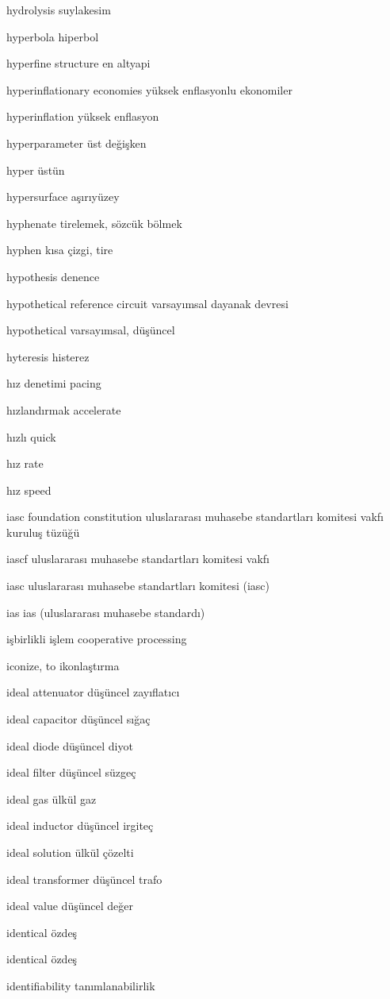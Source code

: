 \documentclass[12pt,fleqn]{article}\usepackage{../../common}
\begin{document}
hydrolysis suylakesim

hyperbola hiperbol

hyperfine structure en altyapi

hyperinflationary economies yüksek enflasyonlu ekonomiler

hyperinflation yüksek enflasyon

hyperparameter üst değişken

hyper üstün

hypersurface aşırıyüzey

hyphenate tirelemek, sözcük bölmek

hyphen kısa çizgi, tire

hypothesis denence

hypothetical reference circuit varsayımsal dayanak devresi

hypothetical varsayımsal, düşüncel

hyteresis histerez

hız denetimi pacing

hızlandırmak accelerate

hızlı quick

hız rate

hız speed

iasc foundation constitution uluslararası muhasebe standartları komitesi vakfı kuruluş tüzüğü

iascf uluslararası muhasebe standartları komitesi vakfı

iasc uluslararası muhasebe standartları komitesi (iasc)

ias ias (uluslararası muhasebe standardı)

işbirlikli işlem cooperative processing

iconize, to ikonlaştırma

ideal attenuator düşüncel zayıflatıcı

ideal capacitor düşüncel sığaç

ideal diode düşüncel diyot

ideal filter düşüncel süzgeç

ideal gas ülkül gaz

ideal inductor düşüncel irgiteç

ideal solution ülkül çözelti

ideal transformer düşüncel trafo

ideal value düşüncel değer

identical özdeş

identical özdeş

identifiability tanımlanabilirlik
\end{document}
